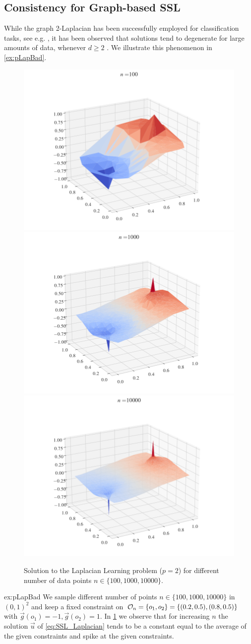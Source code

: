 \subsection{Consistency for Graph-based SSL}\label{sec:CSSL}
%
%
While the graph 2-Laplacian has been successfully employed for classification tasks, see e.g. \cite{zhu2003semi, zhou2005regularization}, it has been observed that solutions tend to degenerate for large amounts of data, whenever $d\geq 2$ \cite{nadler2009statistical, alamgir2011phase, el2016asymptotic}. We illustrate this phenomenon in \cref{ex:pLapBad}.
%
\begin{figure}
\includegraphics[width=.28\textwidth, trim={3.1cm 1cm 3.5cm 0cm},clip]{code/SSL/2Dex_100.png}%
\hfill%
\includegraphics[width=.28\textwidth,trim={3.1cm 1cm 3.5cm 0cm},clip]{code/SSL/2Dex_1000.png}%
\hfill%
\includegraphics[width=.28\textwidth,trim={3.1cm 1cm 3.5cm 0cm},clip]{code/SSL/2Dex_10000.png}%
%
\caption{Solution to the Laplacian Learning problem ($p=2$) for different number of data points $n\in\{100,1000,10000\}$.}\label{fig:pdeg}
\end{figure}
%
%
\begin{example}{}{ex:pLapBad}
We sample different number of points $n\in\{100,1000,10000\}$ in $(0,1)^2$ and keep a fixed constraint on $\mathcal{O}_n=\{o_1, o_2\}=\{(0.2,0.5), (0.8, 0.5)\}$ with $\vec g(o_1) = -1, \vec g(o_2)=1$. In \cref{fig:pdeg} we observe that for increasing $n$ the solution $\vec u$ of \cref{eq:SSL_Laplacian} tends to be a constant equal to the average of the given constraints and spike at the given constraints.
\end{example}
